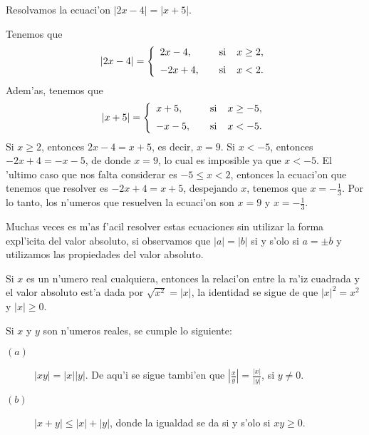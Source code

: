 \begin{ejemplo}
Resolvamos la ecuaci'on $|2x-4|=|x+5|$.
\end{ejemplo}
\noindent Tenemos que
\begin{equation*}
    |2x-4|=\left \{\begin{array}{lr}
    		 2x-4, & \makebox[1cm]{si} x\geq 2,\\[2mm]	
                 -2x+4, &\makebox[1cm]{si}  x< 2.
                \end{array}\right.
\end{equation*}
Adem'as, tenemos que
\begin{equation*}
    |x+5|=\left \{\begin{array}{lr}
                 x+5, &\makebox[1cm]{si}  x\geq -5,\\[2mm]
                 -x-5, & \makebox[1cm]{si} x< -5.
                \end{array}\right.
\end{equation*}
Si $x\geq 2$, entonces $2x-4=x+5$, es decir, $x=9$. Si $x<-5$, entonces
$-2x+4=-x-5$, de donde $x=9$, lo cual es imposible ya que $x<-5$. El 'ultimo caso que nos falta considerar es
 $-5\leq x<2$, entonces la ecuaci'on que tenemos que resolver es $-2x+4=x+5$,
despejando $x$, tenemos que $x=-\frac{1}{3}$. Por lo tanto, los n'umeros que resuelven la ecuaci'on son $x=9$ y $x=-\frac{1}{3}$.

\vei

\noindent Muchas veces es m'as f'acil resolver estas ecuaciones sin
utilizar la forma expl'icita del valor absoluto,
si observamos que $|a|=|b|$ si y s'olo si $a=\pm b$ y utilizamos las propiedades del valor absoluto.

\vei


\begin{observacion}
Si $x$ es un n'umero real cualquiera, entonces la
relaci'on entre la ra'iz cuadrada y el valor absoluto est'a dada por
$\sqrt{x^2}=|x|$,
la identidad se sigue de que  $|x|^2=x^2$ y $|x|\geq 0$.	
\end{observacion}


\begin{propiedades}
Si $x$ y $y$ son n'umeros reales, se cumple lo siguiente:
\begin{description}
\item[$(a)$] $|xy|=|x||y|$. De aqu'i se sigue  tambi'en que $\left |\frac{x}{y}\right |=
\frac{|x|}{|y|}$, si $y\neq 0$.
\item [$(b)$] $|x+y|\leq |x|+|y|$, donde la igualdad se da si y s'olo si $xy\geq 0$.
\end{description}
\label{desigualdadesabsolut}
\end{propiedades}



